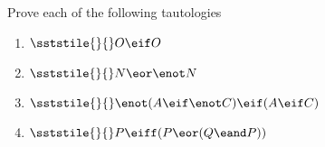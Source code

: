 
\noindent\problempart
Prove each of the following tautologies
\begin{enumerate}[label=(\arabic*)]

\item $\sststile{}{} O \eif O$		%
%
%
%

\item $\sststile{}{} N \eor \enot N$ \label{theorem_ExcludedMiddle}

%
%

\item $\sststile{}{} \enot(A \eif \enot C) \eif (A \eif C)$

%	
%	

\item $\sststile{}{} P \eiff (P \eor (Q \eand P))$ 

%
%

\end{enumerate}


